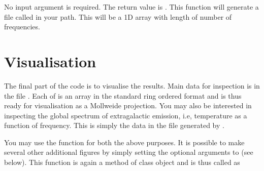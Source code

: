 \documentclass[letterpaper,10pt,english]{sphinxmanual}
\begin{document}
\begin{sphinxVerbatim}[commandchars=\\\{\}]
   

  



\end{sphinxVerbatim}

\sphinxAtStartPar
No input argument is required. The return value is . This
function will generate a file called  in your path. This
will be a 1D array with length of number of frequencies.


\section{Visualisation}
\label{\detokenize{detexp:visualisation}}
\sphinxAtStartPar
The final part of the code is to visualise the results. Main data for
inspection is in the file . Each of 
is an array in the standard ring ordered  format and is thus
ready for visualisation as a Mollweide projection. You may also be
interested in inspecting the global spectrum of extragalactic emission,
i.e, temperature as a function of frequency. This is simply the data in
the file  generated by .

\sphinxAtStartPar
You may use the function  for both the above purposes. It is
possible to make several other additional figures by simply setting the
optional arguments to  (see below). This function is again a
method of class object  and is thus called as
\end{document}
